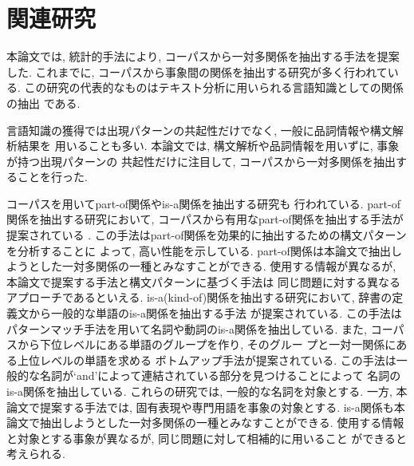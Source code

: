 \section{関連研究}
本論文では, 統計的手法により, コーパスから一対多関係を抽出する手法を提案した. 
これまでに, コーパスから事象間の関係を抽出する研究が多く行われている. 
この研究の代表的なものはテキスト分析に用いられる言語知識としての関係の抽出
である. 

言語知識の獲得では出現パターンの共起性だけでなく, 一般に品詞情報や構文解析結果を
用いることも多い\cite{Utsuro95}. 
本論文では, 構文解析や品詞情報を用いずに, 事象が持つ出現パターンの
共起性だけに注目して, コーパスから一対多関係を抽出することを行った. 

コーパスを用いてpart-of関係やis-a関係を抽出する研究も
行われている. part-of関係を抽出する研究において, 
コーパスから有用なpart-of関係を抽出する手法が提案されている
\cite{Berland99}. 
この手法はpart-of関係を効果的に抽出するための構文パターンを分析することに
よって, 高い性能を示している. 
part-of関係は本論文で抽出しようとした一対多関係の一種とみなすことができる. 
使用する情報が異なるが, 本論文で提案する手法と構文パターンに基づく手法は
同じ問題に対する異なるアプローチであるといえる. 
is-a(kind-of)関係を抽出する研究において, 
辞書の定義文から一般的な単語のis-a関係を抽出する手法
が提案されている\cite{Tsurumaru91}. 
この手法はパターンマッチ手法を用いて名詞や動詞のis-a関係を抽出している.
また, コーパスから下位レベルにある単語のグループを作り, そのグルー
プと一対一関係にある上位レベルの単語を求める
ボトムアップ手法が提案されている\cite{Caraballo99}. 
この手法は一般的な名詞が`and'によって連結されている部分を見つけることによって
名詞のis-a関係を抽出している. 
これらの研究では, 一般的な名詞を対象とする. 
一方, 本論文で提案する手法では, 固有表現や専門用語を事象の対象とする. 
is-a関係も本論文で抽出しようとした一対多関係の一種とみなすことができる. 
使用する情報と対象とする事象が異なるが, 同じ問題に対して相補的に用いること
ができると考えられる. 

